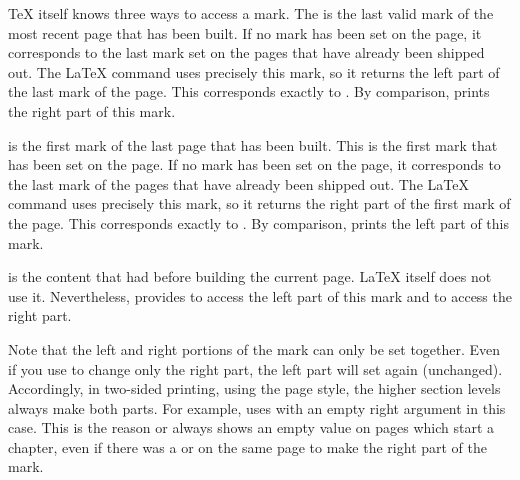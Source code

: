   \TeX{} itself knows three ways to access a mark. The %
   is the last valid mark of the
  most recent page that has been built. If no mark has been set on the page,
  it corresponds to the last mark set on the pages that have already been
  shipped out. The \LaTeX{} command  uses
  precisely this mark, so it returns the left part of the last mark of the
  page. This corresponds exactly to %
  . By comparison, %
   prints the right part of this mark.

   is the
  first mark of the last page that has been built. This is the first mark that
  has been set on the page. If no mark has been set on the page, it
  corresponds to the last mark of the pages that have already been shipped
  out. The \LaTeX{} command  uses precisely
  this mark, so it returns the right part of the first mark of the page. This
  corresponds exactly to %
  . By comparison, %
   prints the left part of this mark.

   is the content
  that  had before building the current page. \LaTeX{} itself
  does not use it. Nevertheless,  provides  to access the
  left part of this mark and %
   to access the right part.

  Note that the left and right portions of the mark
  can only be set together. Even if you use
   to change only the
  right part, the left part will set again (unchanged). Accordingly, in
  two-sided printing, using the %
   page style,
  the higher section levels always make both parts. For example,
   uses  with
  an empty right argument in this case. This is the reason 
   or  always shows an
  empty value on pages which start a chapter, even if there was a
   or  on the
  same page to make the right part of the mark.

